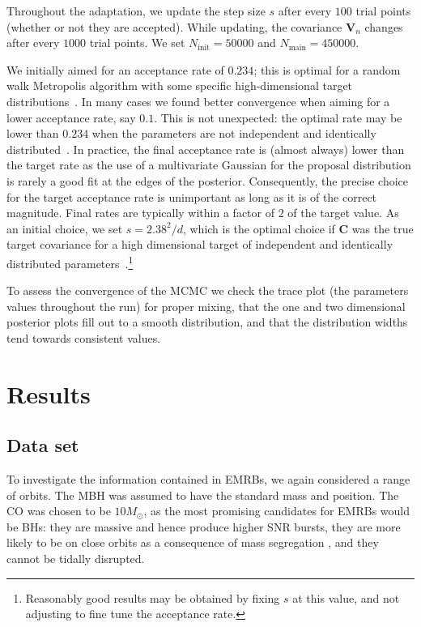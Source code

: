 \documentclass[useAMS,usedcolumn,usegraphicx,usenatbib]{mn2e}
\newcommand{\sub}[1]{\ensuremath{_\mathrm{#1}}}
\begin{document}
Throughout the adaptation, we update the step size $s$ after every $100$ trial points (whether or not they are accepted). While updating, the covariance $\boldsymbol{V}_n$ changes after every $1000$ trial points. We set $N\sub{init} = 50000$ and $N\sub{main} = 450000$.

We initially aimed for an acceptance rate of $0.234$; this is optimal for a random walk Metropolis algorithm with some specific high-dimensional target distributions~\citep{Roberts1997,Roberts2001}. In many cases we found better convergence when aiming for a lower acceptance rate, say $0.1$. This is not unexpected: the optimal rate may be lower than $0.234$ when the parameters are not independent and identically distributed~\citep{Bedard2007, Bedard2008, Bedard2008a}. In practice, the final acceptance rate is (almost always) lower than the target rate as the use of a multivariate Gaussian for the proposal distribution is rarely a good fit at the edges of the posterior. Consequently, the precise choice for the target acceptance rate is unimportant as long as it is of the correct magnitude. Final rates are typically within a factor of $2$ of the target value. As an initial choice, we set $s = 2.38^2/d$, which is the optimal choice if $\boldsymbol{C}$ was the true target covariance for a high dimensional target of independent and identically distributed parameters~\citep{Gelman1996,Roberts1997,Roberts2001,Haario2001}.\footnote{Reasonably good results may be obtained by fixing $s$ at this value, and not adjusting to fine tune the acceptance rate.}

To assess the convergence of the MCMC we check the trace plot (the parameters values throughout the run) for proper mixing, that the one and two dimensional posterior plots fill out to a smooth distribution, and that the distribution widths tend towards consistent values.

\section{Results}\label{sec:Results}

\subsection{Data set}

To investigate the information contained in EMRBs, we again considered a range of orbits. The MBH was assumed to have the standard mass and position. The CO was chosen to be $10 M_\odot$, as the most promising candidates for EMRBs would be BHs: they are massive and hence produce higher SNR bursts, they are more likely to be on close orbits as a consequence of mass segregation \citep{Bahcall1977, Alexander2009, Preto2010}, and they cannot be tidally disrupted.
\end{document}

